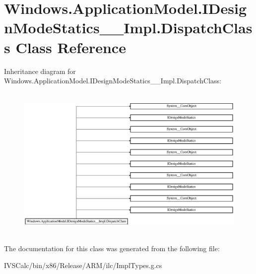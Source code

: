 \hypertarget{class_windows_1_1_application_model_1_1_i_design_mode_statics_____impl_1_1_dispatch_class}{}\section{Windows.\+Application\+Model.\+I\+Design\+Mode\+Statics\+\_\+\+\_\+\+Impl.\+Dispatch\+Class Class Reference}
\label{class_windows_1_1_application_model_1_1_i_design_mode_statics_____impl_1_1_dispatch_class}
Inheritance diagram for Windows.\+Application\+Model.\+I\+Design\+Mode\+Statics\+\_\+\+\_\+\+Impl.\+Dispatch\+Class\+:\begin{figure}[H]
\begin{center}
\leavevmode
\includegraphics[height=7.567567cm]{class_windows_1_1_application_model_1_1_i_design_mode_statics_____impl_1_1_dispatch_class}
\end{center}
\end{figure}


The documentation for this class was generated from the following file\+:\begin{DoxyCompactItemize}
\item 
I\+V\+S\+Calc/bin/x86/\+Release/\+A\+R\+M/ilc/Impl\+Types.\+g.\+cs\end{DoxyCompactItemize}
